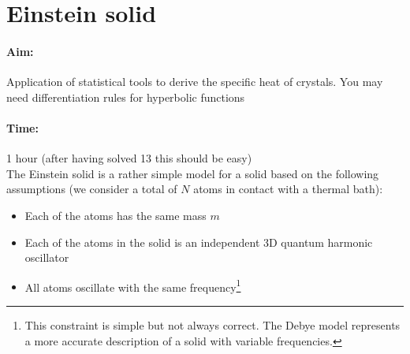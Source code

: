 \documentclass[12pt,a4paper]{article} %
\begin{document}
 
 
 \vspace{1cm}
 

 
 \section{Einstein solid}
 \paragraph{Aim:} Application of statistical tools to derive the specific heat of crystals. You may need differentiation rules for hyperbolic functions
 \paragraph{Time:} 1 hour (after having solved 13 this should be easy) \\
 
 The Einstein solid is a rather simple model for a solid based on the following assumptions (we consider a total of $N$ atoms in contact with a thermal bath):
 \begin{itemize}
  \item Each of the atoms has the same mass $m$
  \item Each of the atoms in the solid is an independent 3D quantum harmonic oscillator 
  \item All atoms oscillate with the same frequency\footnote{This constraint is simple but not always correct. The Debye model represents a more accurate description of a solid with variable frequencies.}
 \end{itemize}
\end{document}
